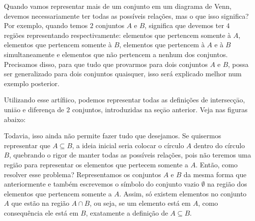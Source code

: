     Quando vamos representar mais de um conjunto em um diagrama de Venn, devemos necessariamente ter todas as possíveis relações, mas o que isso significa? Por exemplo, quando temos $2$ conjuntos $A$ e $B$, significa que devemos ter $4$ regiões representando respectivamente: elementos que pertencem somente à $A$, elementos que pertencem somente à $B$, elementos que pertencem à $A$ e à $B$ simultaneamente e elementos que não pertencem a nenhum dos conjuntos. Precisamos disso, para que tudo que provarmos para dois conjuntos $A$ e $B$, possa ser generalizado para dois conjuntos quaisquer, isso será explicado melhor num exemplo posterior.
    
    Utilizando esse artífiico, podemos representar todas as definições de intersecçāo, uniāo e diferença de $2$ conjuntos, introduzidas na seçāo anterior. Veja nas figuras abaixo:
    
    
    
    
    Todavia, isso ainda não permite fazer tudo que desejamos. Se quisermos representar que $A \subseteq B$, a ideia inicial seria colocar o círculo $A$ dentro do círculo $B$, quebrando o rigor de manter todas as possíveis relações, pois não teremos uma região para representar os elementos que pertecem somente a $A$. Então, como resolver esse problema? Representamos os conjuntos $A$ e $B$ da mesma forma que anteriormente e também escrevemos o símbolo do conjunto vazio $\emptyset$ na região dos elementos que pertencem somente a $A$. Assim, só existem elementos no conjunto $A$ que estão na região $A\cap B$, ou seja, se um elemento está em $A$, como consequência ele está em $B$, exatamente a definição de $A \subseteq B$.
    
